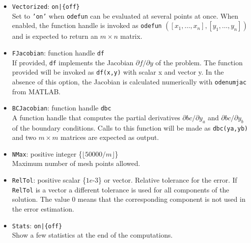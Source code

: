 \documentclass{article}
\begin{document}
\begin{itemize}
 \item \texttt{Vectorized}: \texttt{on|\{off\}} \\
  Set to \texttt{'on'} when \texttt{odefun} can be evaluated at several points at once.
  When enabled, the function handle is invoked as \texttt{odefun}
  $([x_1, \ldots, x_n],[y_1, \ldots, y_n])$ and is expected to return an $m
  \times n$ matrix.
 \item \texttt{FJacobian}: function handle \texttt{df}\\
  If provided, \texttt{df} implements the Jacobian $\partial f/\partial y$ of the problem.
  The function provided will be invoked as \texttt{df(x,y)} with scalar x and vector y.
  In the absence of this option, the Jacobian is calculated numerically with
  \texttt{odenumjac} from MATLAB.
 \item \texttt{BCJacobian}: function handle \texttt{dbc}\\
  A function handle that computes the partial derivatives $\partial bc/\partial y_a$
  and $\partial bc/\partial y_b$ of the boundary conditions.
  Calls to this function will be made as \texttt{dbc(ya,yb)} and two $m \times
  m$ matrices are expected as output.
  \item \texttt{NMax}: positive integer \{$\lfloor 50000/m \rfloor$\} \\
  Maximum number of mesh points allowed.
  \item \texttt{RelTol}: positive scalar \{$1e$-3\} or vector. Relative tolerance for the error. If \texttt{RelTol} is a vector a different tolerance is
used for all components of the solution. The value 0 means that the corresponding
component is not used in the error estimation.
  \item \texttt{Stats}: \texttt{on|\{off\}} \\
  Show a few statistics at the end of the computations.



\end{itemize}
\end{document}
